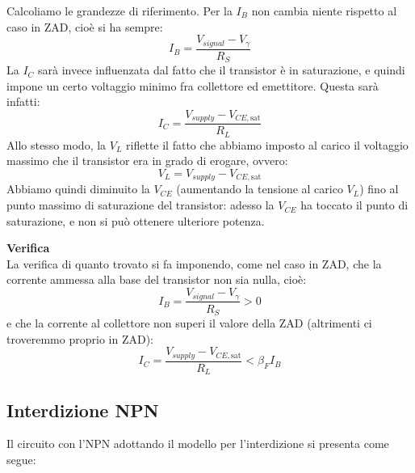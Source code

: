 \documentclass[a4paper,11pt]{article}
\begin{document}
Calcoliamo le grandezze di riferimento. Per la $I_B$ non cambia niente rispetto al caso in ZAD, cioè si ha sempre:
$$
I_B = \frac{V_{signal} - V_\gamma}{R_S}
$$
La $I_C$ sarà invece influenzata dal fatto che il transistor è in saturazione, e quindi impone un certo voltaggio minimo fra collettore ed emettitore. Questa sarà infatti:
$$
I_C = \frac{V_{supply} - V_{CE,\mathrm{sat}}}{R_L}
$$
Allo stesso modo, la $V_L$ riflette il fatto che abbiamo imposto al carico il voltaggio massimo che il transistor era in grado di erogare, ovvero:
$$
V_L = V_{supply} - V_{CE,\mathrm{sat}}
$$
Abbiamo quindi diminuito la $V_{CE}$ (aumentando la tensione al carico $V_L$) fino al punto massimo di saturazione del transistor: adesso la $V_{CE}$ ha toccato il punto di saturazione, e non si può ottenere ulteriore potenza.

\par\smallskip
\noindent
\textbf{\textsf{Verifica}} \\
\noindent
La verifica di quanto trovato si fa imponendo, come nel caso in ZAD, che la corrente ammessa alla base del transistor non sia nulla, cioè:
$$
I_B = \frac{V_{signal} - V_\gamma}{R_S} > 0
$$
e che la corrente al collettore non superi il valore della ZAD (altrimenti ci troveremmo proprio in ZAD):
$$
I_C = \frac{V_{supply} - V_{CE,\mathrm{sat}}}{R_L} < \beta_F I_B
$$

\subsection{Interdizione NPN}
Il circuito con l'NPN adottando il modello per l'interdizione si presenta come segue:
\end{document}
